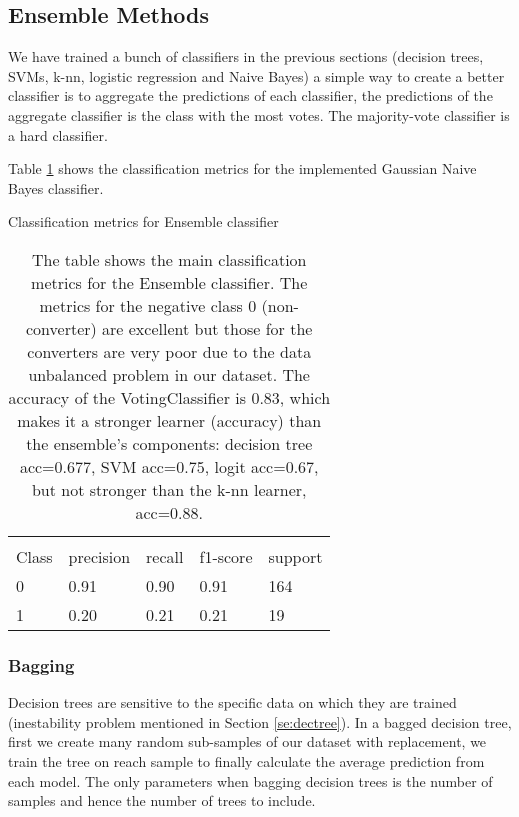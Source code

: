 \documentclass[11pt]{article}
\theoremstyle{definition}
\theoremstyle{remark}
\begin{document}
{\subsection{Ensemble Methods}
\label{se:resensemble}

We have trained a bunch of classifiers in the previous sections (decision trees, SVMs, k-nn, logistic regression and Naive Bayes) a simple way to create a better classifier is to aggregate the predictions of each classifier, the predictions of the aggregate classifier is the class with the most votes. The majority-vote classifier is a hard classifier. 


Table \ref{tab:ensemble} shows the classification metrics for the implemented Gaussian Naive Bayes classifier.
\begin{table}[H]
\caption{Classification metrics for Ensemble classifier}
\begin{center} 
\begin{tabular}{lllll}
\hline
\multicolumn{1}{c}{} \\
Class & precision & recall & f1-score & support     \\
\hline
0 & 0.91  &    0.90   &   0.91   &    164 \\
1 & 0.20  &    0.21   &   0.21   &    19 \\
\hline
\end{tabular}
\caption{The table shows the main classification metrics for the Ensemble classifier. The metrics for the negative class 0 (non-converter) are excellent but those for the converters are very poor due to the data unbalanced problem in our dataset.
The accuracy of the VotingClassifier is 0.83, which makes it a stronger learner (accuracy) than the ensemble's components: decision tree acc=0.677, SVM acc=0.75, logit acc=0.67, but not stronger than the k-nn learner, acc=0.88.
}  \label{tab:ensemble} 
\end{center}
\end{table}


\subsubsection{Bagging}
\label{se:resrf}

Decision trees are sensitive to the specific data on which they are trained (inestability problem mentioned in Section \ref{se:dectree}). In a bagged decision tree, first we create many random sub-samples of our dataset with replacement, we train the tree on reach sample to finally calculate the average prediction from each model. The only parameters when bagging decision trees is the number of samples and hence the number of trees to include.

}
\end{document}
